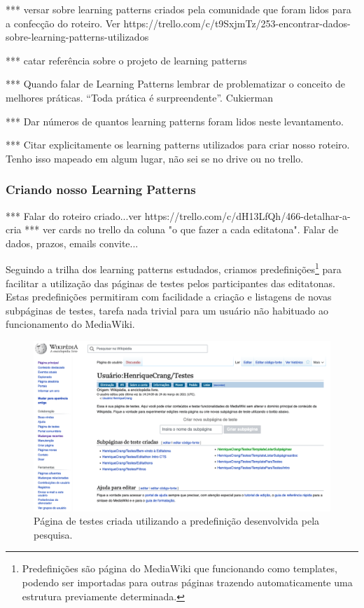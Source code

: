 *** versar sobre learning patterns criados pela comunidade que foram lidos para a confecção do roteiro. Ver https://trello.com/c/t9SxjmTz/253-encontrar-dados-sobre-learning-patterns-utilizados

*** catar referência sobre o projeto de learning patterns

*** Quando falar de Learning Patterns lembrar de problematizar o conceito de melhores práticas. “Toda prática é surpreendente”. Cukierman

*** Dar números de quantos learning patterns foram lidos neste levantamento.

*** Citar explicitamente os learning patterns utilizados para criar nosso roteiro. Tenho isso mapeado em algum lugar, não sei se no drive ou no trello.

\subsubsection{Criando nosso Learning Patterns}

*** Falar do roteiro criado...ver https://trello.com/c/dH13LfQh/466-detalhar-a-cria%
*** ver cards no trello da coluna "o que fazer a cada editatona". Falar de dados, prazos, emails convite...

Seguindo a trilha dos learning patterns estudados, criamos predefinições\footnote{Predefinições são página do MediaWiki que funcionando como templates, podendo ser importadas para outras páginas trazendo automaticamente uma estrutura previamente determinada.} para facilitar a utilização das páginas de testes pelos participantes das editatonas. Estas predefinições permitiram com facilidade a criação e listagens de novas subpáginas de testes, tarefa nada trivial para um usuário não habituado ao funcionamento do MediaWiki.

\begin{figure}[H]
    \centering
    \includegraphics[width=1\textwidth]{Images/pagina_de_Testes.png}
    \caption{Página de testes criada utilizando a predefinição desenvolvida pela pesquisa.}
    \label{fig:pagina_de_testes_editatona}
\end{figure}


